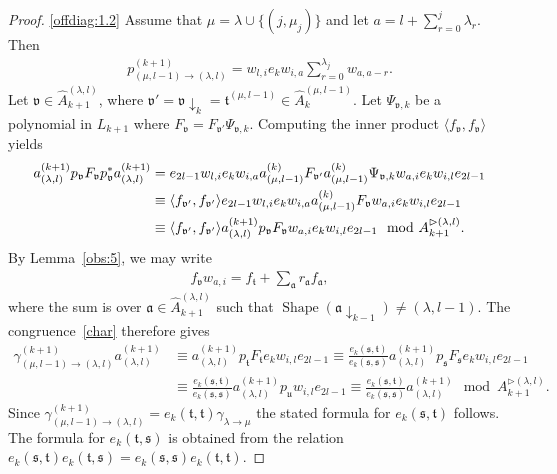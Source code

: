 \documentclass[11pt,a4paper,reqno,svgnames]{amsart}
\theoremstyle{plain}
\theoremstyle{definition}
\numberwithin{equation}{section}
\begin{document}
\begin{proof}
\eqref{offdiag:1.2}  Assume that $\mu=\lambda\cup\lbrace(j,\mu_j)\rbrace$ and let $a=l+\sum_{r=0}^j\lambda_r$. Then
\begin{align*}
p_{(\mu,l-1)\to(\lambda,l)}^{(k+1)}=w_{l,i}e_kw_{i,a}\sum_{r=0}^{\lambda_j}w_{a,a-r}.
\end{align*}
Let $\mathfrak{v}\in\hat{A}_{k+1}^{(\lambda,l)}$, where $\mathfrak{v'}=\mathfrak{v}\downarrow_{k}=\mathfrak{t}^{(\mu,l-1)}\in\hat{A}_k^{(\mu,l-1)}$. Let $\Psi_{\mathfrak{v},k}$ be a polynomial in $L_{k+1}$ where $F_\mathfrak{v}=F_\mathfrak{v'}\Psi_{\mathfrak{v},k}$. Computing the inner product $\langle f_\mathfrak{v},f_\mathfrak{v}\rangle$ yields 
\begin{align}
a_{(\lambda,l)}^{(k+1)}p_\mathfrak{v}F_\mathfrak{v} p_\mathfrak{v}^*a_{(\lambda,l)}^{(k+1)}&= e_{2l-1}w_{l,i}e_kw_{i,a}a_{(\mu,l-1)}^{(k)} F_\mathfrak{v'} a_{(\mu,l-1)}^{(k)} \Psi_{\mathfrak{v},k} w_{a,i}e_kw_{i,l}e_{2l-1}\notag\\
&\equiv \langle f_\mathfrak{v'},f_\mathfrak{v'}\rangle e_{2l-1}w_{l,i}e_kw_{i,a}a_{(\mu,l-1)}^{(k)}F_\mathfrak{v}w_{a,i}e_kw_{i,l}e_{2l-1}\notag\\
&\equiv \langle f_\mathfrak{v'},f_\mathfrak{v'}\rangle a_{(\lambda,l)}^{(k+1)}p_\mathfrak{v}F_\mathfrak{v}w_{a,i}e_kw_{i,l}e_{2l-1}\mod A_{k+1}^{\rhd(\lambda,l)}.\label{char}
\end{align}
By Lemma~\ref{obs:5}, we may write
\begin{align*}
f_\mathfrak{v}w_{a,i}=f_\mathfrak{t}+\sum_\mathfrak{a}r_\mathfrak{a}f_\mathfrak{a},
\end{align*}
where the sum is over $\mathfrak{a}\in\hat{A}_{k+1}^{(\lambda,l)}$ such that $\operatorname{Shape}(\mathfrak{a}\downarrow_{k-1})\ne(\lambda,l-1)$.  The congruence~\eqref{char} therefore gives 
\begin{align*}
\gamma_{(\mu,l-1)\to(\lambda,l)}^{(k+1)}a_{(\lambda,l)}^{(k+1)}&\equiv a_{(\lambda,l)}^{(k+1)}p_\mathfrak{t}F_\mathfrak{t}e_kw_{i,l}e_{2l-1}\equiv \frac{e_k(\mathfrak{s,t})}{e_k(\mathfrak{s,s})}a_{(\lambda,l)}^{(k+1)}p_\mathfrak{s}F_\mathfrak{s}e_kw_{i,l}e_{2l-1}\\ 
&\equiv \frac{e_k(\mathfrak{s,t})}{e_k(\mathfrak{s,s})}a_{(\lambda,l)}^{(k+1)}p_\mathfrak{u}w_{i,l}e_{2l-1} \equiv\frac{e_k(\mathfrak{s,t})}{e_k(\mathfrak{s,s})}a_{(\lambda,l)}^{(k+1)} \mod A_{k+1}^{\rhd(\lambda,l)}. 
\end{align*}
Since $\gamma_{(\mu,l-1)\to(\lambda,l)}^{(k+1)}=e_k(\mathfrak{t,t})\gamma_{\lambda\to\mu}$ the stated formula for $e_k(\mathfrak{s,t})$ follows. The formula for $e_k(\mathfrak{t,s})$ is  obtained from the relation $e_k(\mathfrak{s,t})e_k(\mathfrak{t,s})= e_k(\mathfrak{s,s})e_k(\mathfrak{t,t})$. 
\end{proof}
\end{document}
